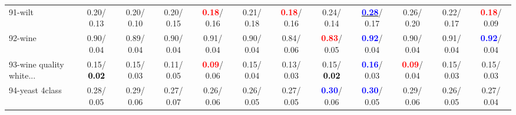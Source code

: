 \begin{table}[h]
\begin{center}
{\begin{tabular}{lc|c|c|c|c|c|c|c|c|c|c}
91-wilt &   0.20/  0.13 &   0.20/  0.10 &   0.20/  0.15 & \textcolor{red}{\textbf{  0.18}}/  0.16 &   0.21/  0.18 & \textcolor{red}{\textbf{  0.18}}/  0.16 &   0.24/  0.14 & \underline{\textcolor{blue}{\textbf{  0.28}}}/  0.17 &   0.26/  0.20 &   0.22/  0.17 & \textcolor{red}{\textbf{  0.18}}/  0.09 \\
92-wine &   0.90/  0.04 &   0.89/  0.04 &   0.90/  0.04 &   0.91/  0.04 &   0.90/  0.04 &   0.84/  0.06 & \textcolor{red}{\textbf{  0.83}}/  0.05 & \textcolor{blue}{\textbf{  0.92}}/  0.04 &   0.90/  0.04 &   0.91/  0.04 & \textcolor{blue}{\textbf{  0.92}}/  0.04 \\ \hline
93-wine quality white... &   0.15/\textcolor{black}{\textbf{  0.02}} &   0.15/  0.03 &   0.11/  0.05 & \textcolor{red}{\textbf{  0.09}}/  0.06 &   0.15/  0.04 &   0.13/  0.03 &   0.15/\textcolor{black}{\textbf{  0.02}} & \textcolor{blue}{\textbf{  0.16}}/  0.03 & \textcolor{red}{\textbf{  0.09}}/  0.04 &   0.15/  0.03 &   0.15/  0.03 \\
94-yeast 4class &   0.28/  0.05 &   0.29/  0.06 &   0.27/  0.07 &   0.26/  0.06 &   0.26/  0.05 &   0.27/  0.05 & \textcolor{blue}{\textbf{  0.30}}/  0.06 & \textcolor{blue}{\textbf{  0.30}}/  0.05 &   0.29/  0.06 &   0.26/  0.05 &   0.27/  0.04 \\\end{tabular}}\label{stratsALCKappa2aNB}
\end{center}
\end{table}

